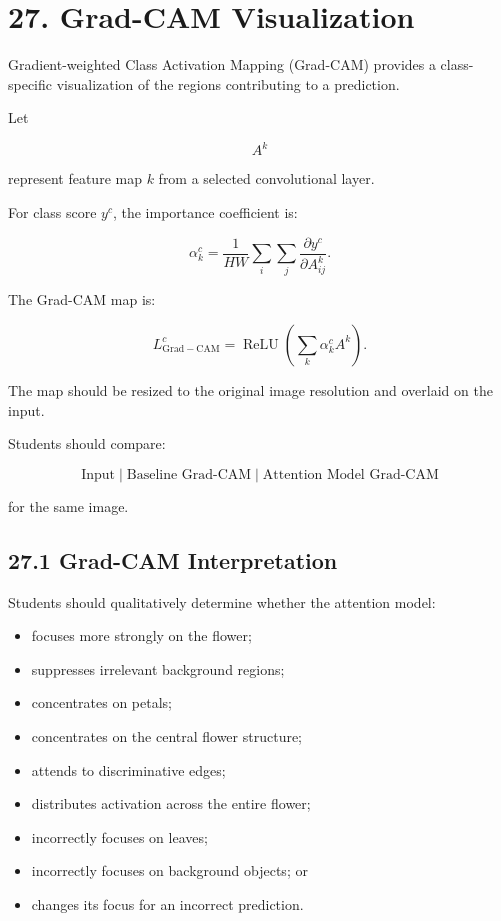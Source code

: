 \documentclass[10pt]{article}
\begin{document}
\section*{27. Grad-CAM Visualization}

Gradient-weighted Class Activation Mapping (Grad-CAM) provides a
class-specific visualization of the regions contributing to a prediction.

Let

\[
A^k
\]

represent feature map $k$ from a selected convolutional layer.

For class score $y^c$, the importance coefficient is:

\[
\alpha_k^c
=
\frac{1}{HW}
\sum_i
\sum_j
\frac{\partial y^c}
{\partial A_{ij}^k}.
\]

The Grad-CAM map is:

\[
L_{\mathrm{Grad-CAM}}^c
=
\operatorname{ReLU}
\left(
\sum_k
\alpha_k^c A^k
\right).
\]

The map should be resized to the original image resolution and overlaid on
the input.

Students should compare:

\[
\boxed{
\text{Input}
\;|\;
\text{Baseline Grad-CAM}
\;|\;
\text{Attention Model Grad-CAM}
}
\]

for the same image.

\subsection*{27.1 Grad-CAM Interpretation}

Students should qualitatively determine whether the attention model:

\begin{itemize}

\item focuses more strongly on the flower;

\item suppresses irrelevant background regions;

\item concentrates on petals;

\item concentrates on the central flower structure;

\item attends to discriminative edges;

\item distributes activation across the entire flower;

\item incorrectly focuses on leaves;

\item incorrectly focuses on background objects; or

\item changes its focus for an incorrect prediction.

\end{itemize}
\end{document}
